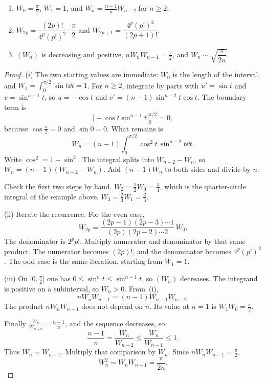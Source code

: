 \begin{proposition}\label{prop:wallis}
\begin{enumerate}[label=(\roman*)]
\item $W_0=\frac\pi2$, $W_1=1$, and $W_n=\frac{n-1}nW_{n-2}$ for $n\ge2$.
\item $W_{2p}=\dfrac{(2p)!}{4^p(p!)^2}\cdot\dfrac\pi2$ and $W_{2p+1}=\dfrac{4^p(p!)^2}{(2p+1)!}$.
\item $(W_n)$ is decreasing and positive, $nW_nW_{n-1}=\frac\pi2$, and $W_n\sim\sqrt{\dfrac\pi{2n}}$.
\end{enumerate}
\end{proposition}
\begin{proof}
(i) The two starting values are immediate: $W_0$ is the length of the interval, and $W_1=\int_0^{\pi/2}\sin t\dd t=1$. For $n\ge2$, integrate by parts with $u'=\sin t$ and $v=\sin^{n-1}t$, so $u=-\cos t$ and $v'=(n-1)\sin^{n-2}t\cos t$. The boundary term is
\[
\bigl[-\cos t\sin^{n-1}t\bigr]_0^{\pi/2}=0,
\]
because $\cos\frac\pi2=0$ and $\sin0=0$. What remains is
\[
W_n=(n-1)\int_0^{\pi/2}\cos^2t\,\sin^{n-2}t\dd t.
\]
Write $\cos^2=1-\sin^2$. The integral splits into $W_{n-2}-W_n$, so $W_n=(n-1)(W_{n-2}-W_n)$. Add $(n-1)W_n$ to both sides and divide by $n$.

Check the first two steps by hand. $W_2=\frac12 W_0=\frac\pi4$, which is the quarter-circle integral of the example above. $W_3=\frac23 W_1=\frac23$.

(ii) Iterate the recurrence. For the even case,
\[
W_{2p}=\frac{(2p-1)(2p-3)\cdots1}{(2p)(2p-2)\cdots2}\,W_0.
\]
The denominator is $2^pp!$. Multiply numerator and denominator by that same product. The numerator becomes $(2p)!$, and the denominator becomes $4^p(p!)^2$. The odd case is the same iteration, starting from $W_1=1$.

(iii) On $\bigl[0,\frac\pi2\bigr]$ one has $0\le\sin^nt\le\sin^{n-1}t$, so $(W_n)$ decreases. The integrand is positive on a subinterval, so $W_n>0$. From~(i),
\[
nW_nW_{n-1}=(n-1)W_{n-1}W_{n-2}.
\]
The product $nW_nW_{n-1}$ does not depend on $n$. Its value at $n=1$ is $W_1W_0=\frac\pi2$.

Finally $\frac{W_n}{W_{n-2}}=\frac{n-1}n$, and the sequence decreases, so
\[
\frac{n-1}n=\frac{W_n}{W_{n-2}}\le\frac{W_n}{W_{n-1}}\le1.
\]
Thus $W_n\sim W_{n-1}$. Multiply that comparison by $W_n$. Since $nW_nW_{n-1}=\frac\pi2$,
\[
W_n^2\sim W_nW_{n-1}=\frac\pi{2n}.
\]
\end{proof}

